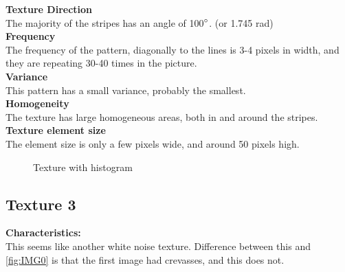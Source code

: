 \documentclass{article}
\begin{document}
\textbf{Texture Direction}\\
The majority of the stripes has an angle of 100$\degree$. (or 1.745 rad)\\ 
 
\textbf{Frequency} \\
The frequency of the pattern, diagonally to the lines is 3-4 pixels in width, and they are repeating 30-40 times in the picture.
\\ 


\textbf{Variance}\\
This pattern has a small variance, probably the smallest.
\\

\textbf{Homogeneity}\\
The texture has large homogeneous areas, both in and around the stripes.\\

\textbf{Texture element size}\\
The element size is only a few pixels wide, and around 50 pixels high.


\begin{figure}[h]%
	\centering
    \qquad
    \caption{Texture with histogram}%
    \label{fig:IMG2}%
\end{figure}





\newpage
\subsection{Texture 3}
\textbf{Characteristics:}\\
This seems like another white noise texture. Difference between this and \ref{fig:IMG0} is that the first image had crevasses, and this does not. \\
\end{document}
